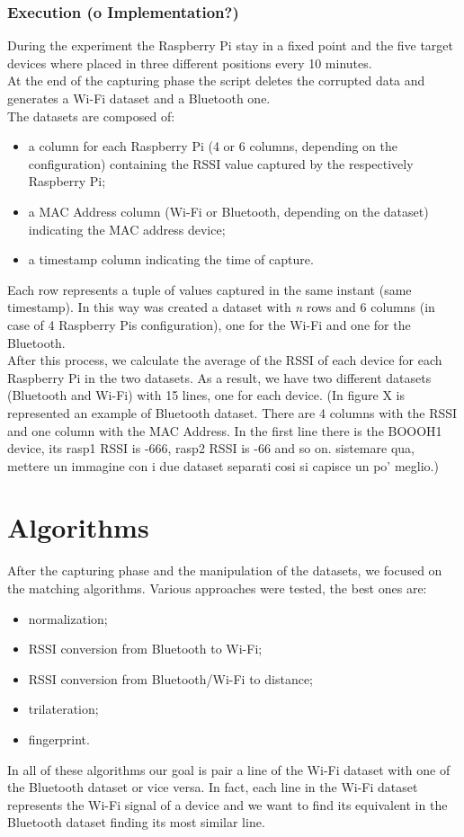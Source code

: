 \subsubsection{Execution (o Implementation?)}
During the experiment the Raspberry Pi stay in a fixed point and the five target devices where placed in three different positions every 10 minutes. \\
At the end of the capturing phase the script deletes the corrupted data and generates a Wi-Fi dataset and a Bluetooth one.\\
The datasets are composed of:
\begin{itemize}
\item a column for each Raspberry Pi (4 or 6 columns, depending on the configuration) containing the RSSI value captured by the respectively Raspberry Pi;
\item a MAC Address column (Wi-Fi or Bluetooth, depending on the dataset) indicating the MAC address device;
\item a timestamp column indicating the time of capture.
\end{itemize}
Each row represents a tuple of values captured in the same instant (same timestamp).
In this way was created a dataset with \textit{n} rows and 6 columns (in case of 4 Raspberry Pis configuration), one for the Wi-Fi and one for the Bluetooth.\\
\linebreak
After this process, we calculate the average of the RSSI of each device for each Raspberry Pi in the two datasets. As a result, we have two different datasets (Bluetooth and Wi-Fi) with 15 lines, one for each device. (In figure X is represented an example of Bluetooth dataset. There are 4 columns with the RSSI and one column with the MAC Address. In the first line there is the BOOOH1 device, its rasp1 RSSI is -666, rasp2 RSSI is -66 and so on. sistemare qua, mettere un immagine con i due dataset separati cosi si capisce un po' meglio.)

\section{Algorithms}
After the capturing phase and the manipulation of the datasets, we focused on the matching algorithms. Various approaches were tested, the best ones are:
\begin{itemize}
\item normalization;
\item RSSI conversion from Bluetooth to Wi-Fi;
\item RSSI conversion from Bluetooth/Wi-Fi to distance;
\item trilateration;
\item fingerprint.
\end{itemize}
In all of these algorithms our goal is pair a line of the Wi-Fi dataset with one of the Bluetooth dataset or vice versa. In fact, each line in the Wi-Fi dataset represents the Wi-Fi signal of a device and we want to find its equivalent in the Bluetooth dataset finding its most similar line.

